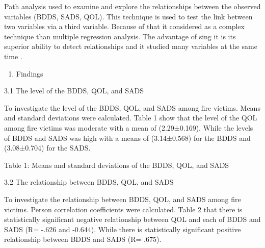 \documentclass[10pt]{NSP1}
\begin{document}
Path analysis used to examine and explore the relationships between the observed variables (BDDS, SADS, QOL). This technique is used to test the link between two variables via a third variable. Because of that it considered as a complex technique than multiple regression analysis. The advantage of sing it is its superior ability to detect relationships and it studied many variables at the same time .

\begin{enumerate}
  \item Findings
\end{enumerate}

3.1 The level of the BDDS, QOL, and SADS

To investigate the level of the BDDS, QOL, and SADS among fire victims. Means and standard deviations were calculated. Table 1 show that the level of the QOL among fire victims was moderate with a mean of (2.29±0.169). While the levels of BDDS and SADS was high with a means of (3.14±0.568) for the BDDS and (3.08±0.704) for the SADS.

\begin{table}[htbp]
\centering
{}
\caption{}

\end{table}

Table 1: Means and standard deviations of the BDDS, QOL, and SADS

3.2 The relationship between BDDS, QOL, and SADS

To investigate the relationship between BDDS, QOL, and SADS among fire victims. Person correlation coefficients were calculated. Table 2 that there is statistically significant negative relationship between QOL and each of BDDS and SADS (R= -.626 and -0.644). While there is statistically significant positive relationship between BDDS and SADS (R= .675).

\begin{table}[htbp]
\centering
{}
\caption{}

\end{table}
\end{document}

